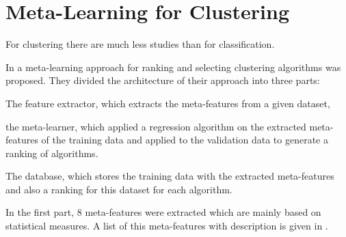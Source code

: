 \section{Meta-Learning for Clustering}


For clustering there are much less studies than for classification.

In \cite{DeSoutoRankingApproach} a meta-learning approach for ranking and selecting clustering algorithms was proposed.
They divided the architecture of their approach into three parts: \begin{inparaenum}
\item The feature extractor, which extracts the meta-features from a given dataset, 
\item the meta-learner, which applied  a regression algorithm on the extracted meta-features of the training data and applied to the validation data to generate a ranking of algorithms.
\item The database, which stores the training data with the extracted meta-features and also a ranking for this dataset for each algorithm.
\end{inparaenum}
In the first part, 8 meta-features were extracted which are mainly based on statistical
measures.
A list of this meta-features with description is given in .
